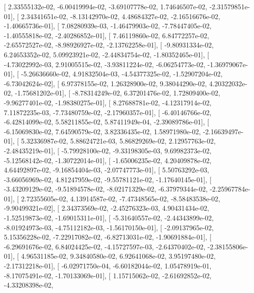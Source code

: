 \documentclass{article}
\begin{document}
       [  2.33555132e-02,  -6.00419994e-02,  -3.69107778e-02,
          1.74646507e-02,  -2.31579851e-01],
       [  2.34341651e-02,  -8.13142970e-02,   4.48684327e-02,
         -2.16516676e-02,  -1.40665736e-01],
       [  7.08280939e-03,  -1.46479903e-02,  -7.78447405e-02,
         -1.40555818e-02,  -2.40286852e-01],
       [  7.46119860e-02,   6.84772257e-02,  -2.65572527e-02,
         -8.98926927e-02,  -2.13762258e-01],
       [ -9.80931334e-02,   6.24653352e-02,   5.09923921e-02,
         -2.44834754e-02,  -1.80352465e-01],
       [ -4.73022992e-03,   2.91005515e-02,  -3.93811224e-02,
         -6.06254773e-02,  -1.36979067e-01],
       [ -5.26636660e-02,   4.91832504e-03,  -4.54377325e-02,
         -1.52907204e-02,  -6.73042624e-02],
       [  6.97378155e-02,   1.26328900e-02,   9.38044290e-02,
          4.20322032e-02,  -1.75681202e-01],
       [ -8.78314249e-02,   6.37201476e-02,   1.72809400e-02,
         -9.96277401e-02,  -1.98380275e-01],
       [  8.27688781e-02,  -4.12317914e-02,   7.11872235e-03,
         -7.73480759e-02,  -2.17960357e-01],
       [ -6.40146766e-02,  -6.42814099e-02,   5.58211855e-02,
          5.87411949e-04,  -2.39089786e-01],
       [ -6.15069830e-02,   7.64590579e-02,   3.82336435e-02,
          1.58971980e-02,  -2.16639497e-01],
       [  5.32336987e-02,   5.88624721e-03,   5.86829269e-02,
          2.12957763e-02,  -2.48435219e-01],
       [ -5.79928100e-02,  -9.33198305e-03,   9.69982373e-02,
         -5.12568142e-02,  -1.30722014e-01],
       [ -1.65006235e-02,   4.20409878e-02,   4.64492897e-02,
         -9.16854404e-03,  -2.07747773e-01],
       [  5.50763292e-03,  -3.66056969e-02,   4.81247959e-02,
         -9.55781121e-02,  -1.17640145e-01],
       [ -3.43209129e-02,  -9.51894578e-02,  -8.02171329e-02,
         -6.37979344e-02,  -2.25967784e-01],
       [  2.72355605e-02,   4.13914587e-02,  -7.47348565e-02,
         -8.58483538e-02,  -9.90499321e-02],
       [  2.34373569e-02,  -2.45276323e-03,   4.90431434e-02,
         -1.52519873e-02,  -1.69015311e-01],
       [ -5.31640557e-02,  -2.44343899e-02,  -8.01924973e-03,
         -4.75112182e-03,  -1.56170150e-01],
       [ -2.09137965e-02,   5.15356228e-02,  -7.22917082e-02,
         -6.82713031e-02,  -1.90691884e-01],
       [ -6.29691676e-02,   6.84024425e-02,  -4.15727597e-03,
         -2.64370402e-02,  -2.38155806e-01],
       [  4.96531185e-02,   9.34840580e-02,   6.92641068e-02,
          3.95197480e-02,  -2.17312218e-01],
       [ -6.02971750e-04,  -6.60182044e-02,   1.05478919e-01,
         -8.17075491e-02,  -1.70133069e-01],
       [  1.15715062e-02,  -2.61692852e-02,  -4.33208398e-02,
\end{document}
